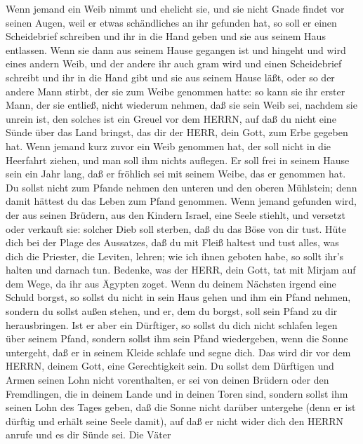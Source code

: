  Wenn jemand ein Weib nimmt und ehelicht sie, und sie nicht
Gnade findet vor seinen Augen, weil er etwas schändliches an ihr
gefunden hat, so soll er einen Scheidebrief schreiben und ihr in die
Hand geben und sie aus seinem Haus entlassen.  Wenn sie dann
aus seinem Hause gegangen ist und hingeht und wird eines andern Weib,
 und der andere ihr auch gram wird und einen Scheidebrief
schreibt und ihr in die Hand gibt und sie aus seinem Hause läßt, oder so
der andere Mann stirbt, der sie zum Weibe genommen hatte: 
so kann sie ihr erster Mann, der sie entließ, nicht wiederum nehmen, daß
sie sein Weib sei, nachdem sie unrein ist, den solches ist ein Greuel
vor dem HERRN, auf daß du nicht eine Sünde über das Land bringst, das
dir der HERR, dein Gott, zum Erbe gegeben hat.  Wenn jemand
kurz zuvor ein Weib genommen hat, der soll nicht in die Heerfahrt
ziehen, und man soll ihm nichts auflegen. Er soll frei in seinem Hause
sein ein Jahr lang, daß er fröhlich sei mit seinem Weibe, das er
genommen hat.  Du sollst nicht zum Pfande nehmen den unteren
und den oberen Mühlstein; denn damit hättest du das Leben zum Pfand
genommen.  Wenn jemand gefunden wird, der aus seinen
Brüdern, aus den Kindern Israel, eine Seele stiehlt, und versetzt oder
verkauft sie: solcher Dieb soll sterben, daß du das Böse von dir tust.
 Hüte dich bei der Plage des Aussatzes, daß du mit Fleiß
haltest und tust alles, was dich die Priester, die Leviten, lehren; wie
ich ihnen geboten habe, so sollt ihr's halten und darnach tun.
 Bedenke, was der HERR, dein Gott, tat mit Mirjam auf dem
Wege, da ihr aus Ägypten zoget.  Wenn du deinem Nächsten
irgend eine Schuld borgst, so sollst du nicht in sein Haus gehen und ihm
ein Pfand nehmen,  sondern du sollst außen stehen, und er,
dem du borgst, soll sein Pfand zu dir herausbringen.  Ist
er aber ein Dürftiger, so sollst du dich nicht schlafen legen über
seinem Pfand,  sondern sollst ihm sein Pfand wiedergeben,
wenn die Sonne untergeht, daß er in seinem Kleide schlafe und segne
dich. Das wird dir vor dem HERRN, deinem Gott, eine Gerechtigkeit sein.
 Du sollst dem Dürftigen und Armen seinen Lohn nicht
vorenthalten, er sei von deinen Brüdern oder den Fremdlingen, die in
deinem Lande und in deinen Toren sind,  sondern sollst ihm
seinen Lohn des Tages geben, daß die Sonne nicht darüber untergehe (denn
er ist dürftig und erhält seine Seele damit), auf daß er nicht wider
dich den HERRN anrufe und es dir Sünde sei.  Die Väter
